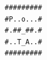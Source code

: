 \documentclass[11pt, a4paper]{article}
\begin{document}
\begin{itemize}
    \vspace{0.1cm}
\begin{verbatim}
#########
#P..o...#
#.##_##.#
#..T_A..#
#########
\end{verbatim}
\end{itemize}
\end{document}
